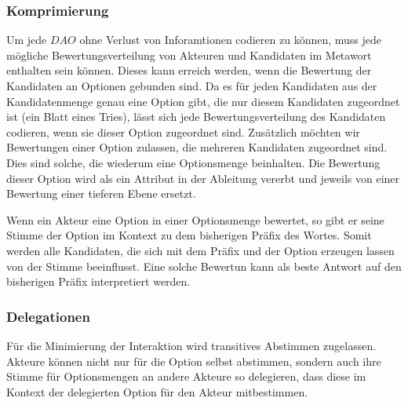 \documentclass[]{article}
\begin{document}
\subsubsection*{Komprimierung}
Um jede $DAO$ ohne Verlust von Inforamtionen codieren zu können, muss jede mögliche Bewertungsverteilung von Akteuren und Kandidaten im Metawort enthalten sein können. 
Dieses kann erreich werden, wenn die Bewertung der Kandidaten an Optionen gebunden sind. Da es für jeden Kandidaten aus der Kandidatenmenge genau eine Option gibt, die nur diesem Kandidaten zugeordnet ist (ein Blatt eines Tries), lässt sich jede Bewertungsverteilung des Kandidaten codieren, wenn sie dieser Option zugeordnet sind. Zusätzlich möchten wir Bewertungen einer Option zulassen, die mehreren Kandidaten zugeordnet sind. Dies sind solche, die wiederum eine Optionsmenge beinhalten. 
Die Bewertung dieser Option wird als ein Attribut in der Ableitung vererbt\cite{Knuth1968} und jeweils von einer Bewertung einer tieferen Ebene ersetzt.

Wenn ein Akteur eine Option in einer Optionsmenge bewertet, so gibt er seine Stimme der Option im Kontext zu dem bisherigen Präfix des Wortes. Somit werden alle Kandidaten, die sich mit dem Präfix und der Option erzeugen lassen von der Stimme beeinflusst. Eine solche Bewertun kann als beste Antwort auf den bisherigen Präfix interpretiert werden.





\subsubsection*{Delegationen}

Für die Minimierung der Interaktion wird transitives Abstimmen zugelassen. Akteure können nicht nur für die Option selbst abstimmen, sondern auch ihre Stimme für Optionsmengen an andere Akteure so delegieren, dass diese im Kontext der delegierten Option für den Akteur mitbestimmen.
\end{document}

